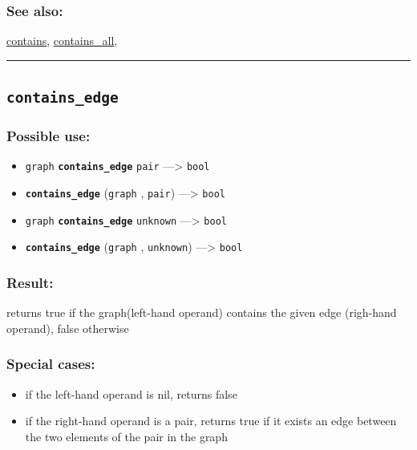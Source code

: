 \documentclass[]{book}
\providecommand{\tightlist}{%
  \setlength{\itemsep}{0pt}\setlength{\parskip}{0pt}}
\theoremstyle{definition}
\theoremstyle{definition}
\theoremstyle{definition}
\theoremstyle{remark}
\begin{document}
\subsubsection{See also:}\label{see-also-64}

\href{operators-b-to-c.html\#contains}{contains},
\href{operators-b-to-c.html\#contains_all}{contains\_all},

\begin{center}\rule{0.5\linewidth}{\linethickness}\end{center}

\subsection{\texorpdfstring{\texttt{contains\_edge}}{contains\_edge}}\label{contains_edge}

\subsubsection{Possible use:}\label{possible-use-102}

\begin{itemize}
\tightlist
\item
  \texttt{graph} \textbf{\texttt{contains\_edge}} \texttt{pair}
  ---\textgreater{} \texttt{bool}
\item
  \textbf{\texttt{contains\_edge}} (\texttt{graph} , \texttt{pair})
  ---\textgreater{} \texttt{bool}
\item
  \texttt{graph} \textbf{\texttt{contains\_edge}} \texttt{unknown}
  ---\textgreater{} \texttt{bool}
\item
  \textbf{\texttt{contains\_edge}} (\texttt{graph} , \texttt{unknown})
  ---\textgreater{} \texttt{bool}
\end{itemize}

\subsubsection{Result:}\label{result-100}

returns true if the graph(left-hand operand) contains the given edge
(righ-hand operand), false otherwise

\subsubsection{Special cases:}\label{special-cases-35}

\begin{itemize}
\tightlist
\item
  if the left-hand operand is nil, returns false\\
\item
  if the right-hand operand is a pair, returns true if it exists an edge
  between the two elements of the pair in the graph
\end{itemize}
\end{document}
